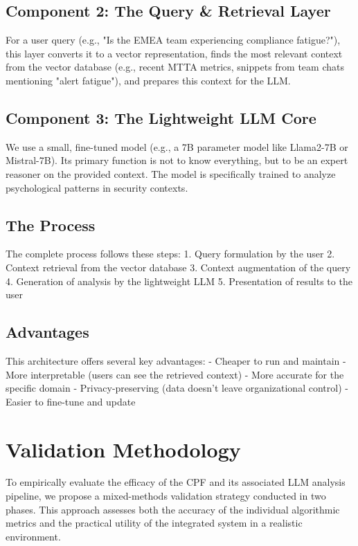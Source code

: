 \documentclass[11pt, a4paper]{article}
\begin{document}
\subsection{Component 2: The Query \& Retrieval Layer}
For a user query (e.g., "Is the EMEA team experiencing compliance fatigue?"), this layer converts it to a vector representation, finds the most relevant context from the vector database (e.g., recent MTTA metrics, snippets from team chats mentioning "alert fatigue"), and prepares this context for the LLM.

\subsection{Component 3: The Lightweight LLM Core}
We use a small, fine-tuned model (e.g., a 7B parameter model like Llama2-7B or Mistral-7B). Its primary function is not to know everything, but to be an expert reasoner on the provided context. The model is specifically trained to analyze psychological patterns in security contexts.

\subsection{The Process}
The complete process follows these steps:
1. Query formulation by the user
2. Context retrieval from the vector database
3. Context augmentation of the query
4. Generation of analysis by the lightweight LLM
5. Presentation of results to the user

\subsection{Advantages}
This architecture offers several key advantages:
- Cheaper to run and maintain
- More interpretable (users can see the retrieved context)
- More accurate for the specific domain
- Privacy-preserving (data doesn't leave organizational control)
- Easier to fine-tune and update

\section{Validation Methodology}
\label{sec:validation}

To empirically evaluate the efficacy of the CPF and its associated LLM analysis pipeline, we propose a mixed-methods validation strategy conducted in two phases. This approach assesses both the accuracy of the individual algorithmic metrics and the practical utility of the integrated system in a realistic environment.
\end{document}
